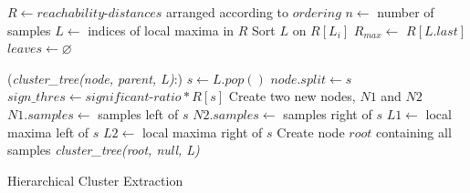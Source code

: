 \documentclass[a4paper]{report}
\begin{document}
{
    \fontsize{10}{12}
    \selectfont
    \begin{algorithm}[H]
        \DontPrintSemicolon
        \BlankLine
        \BlankLine

        $R \gets reachability$-$distances$ arranged according to $ordering$\;
        $n \gets$ number of samples\;
        $L \gets$ indices of local maxima in $R$\;
        Sort $L$ on $R[L_i]$\;
        $R_{max} \gets$ $R[L.last]$\;
        $leaves \gets \varnothing$\;

        \Fn(\emph{cluster\_tree(node, parent, L)}:){
            $s \gets L.pop()$\;
            $node.split \gets s$\;
            $sign\_thres \gets significant$-$ratio * R[s]$\;
            Create two new nodes, $N1$ and $N2$\;
            $N1.samples \gets$ samples left of $s$\;
            $N2.samples \gets$ samples right of $s$\;
            $L1 \gets $ local maxima left of $s$\;
            $L2 \gets $ local maxima right of $s$\;
        }
        \BlankLine
        Create node $root$ containing all samples\;
        \emph{cluster\_tree(root, null, L)}\;
        \BlankLine
        \caption{Hierarchical Cluster Extraction}
        \label{alg:hierextr}
    \end{algorithm}
}
\end{document}
